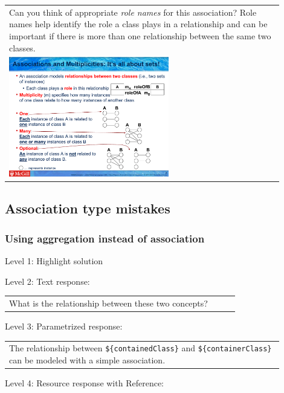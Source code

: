 \begin{tabular}{|p{0.9\linewidth}}
Can you think of appropriate \textit{role names}
for this association? Role names help identify the role a class plays in a
relationship and can be important if there is more than one relationship
between the same two classes.

\\
\includegraphics[width=0.6\textwidth]{images/role_name.png}

\end{tabular} \medskip


\subsection{Association type mistakes}

\subsubsection{Using aggregation instead of association}

\noindent Level 1: Highlight solution  \medskip

\noindent Level 2: Text response: \medskip

\begin{tabular}{|p{0.9\linewidth}}
What is the relationship between these two concepts?
\end{tabular} \medskip

\noindent Level 3: Parametrized response: \medskip

\begin{tabular}{|p{0.9\linewidth}}
The relationship between \verb|${containedClass}| and \verb|${containerClass}| can be modeled with a simple association.
\end{tabular} \medskip

\noindent Level 4: Resource response with Reference: \medskip


